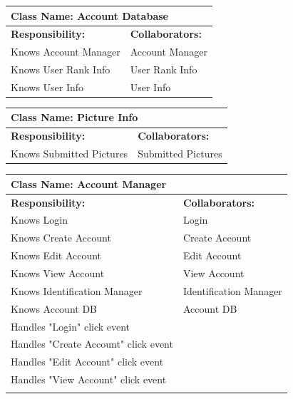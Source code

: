 \documentclass[]{article}
\begin{document}
\begin{itemize}
	\begin{table}
		\centering
		\begin{tabular}{|p{8cm}|p{8cm}|}
		\hline 
		 \multicolumn{2}{|l|}{\textbf{Class Name:} Account Database} \\
		\hline
		\textbf{Responsibility:} & \textbf{Collaborators:} \\
		\hline 
            Knows Account Manager & Account Manager\\ 
            Knows User Rank Info & User Rank Info \\
            Knows User Info & User Info       
		\vspace{1in} \\
		\hline
		\end{tabular}
	\end{table}

	\begin{table}
		\centering
		\begin{tabular}{|p{8cm}|p{8cm}|}
		\hline 
		 \multicolumn{2}{|l|}{\textbf{Class Name:} Picture Info} \\
		\hline
		\textbf{Responsibility:} & \textbf{Collaborators:} \\
		\hline
            Knows Submitted Pictures & Submitted Pictures 
		\vspace{1in} \\
		\hline
		\end{tabular}
	\end{table}

	\begin{table}
		\centering
		\begin{tabular}{|p{8cm}|p{8cm}|}
		\hline 
		 \multicolumn{2}{|l|}{\textbf{Class Name:} Account Manager} \\
		\hline
		\textbf{Responsibility:} & \textbf{Collaborators:} \\
		\hline
            Knows Login & Login \\
            Knows Create Account & Create Account \\
            Knows Edit Account & Edit Account \\
            Knows View Account & View Account \\
            Knows Identification Manager & Identification Manager \\
            Knows Account DB & Account DB \\
            Handles "Login" click event & \\
            Handles "Create Account" click event & \\
            Handles "Edit Account" click event & \\
            Handles "View Account" click event & \\
		\vspace{1cm} & \\
		\hline
		\end{tabular}
	\end{table}


\end{itemize}
\end{document}
